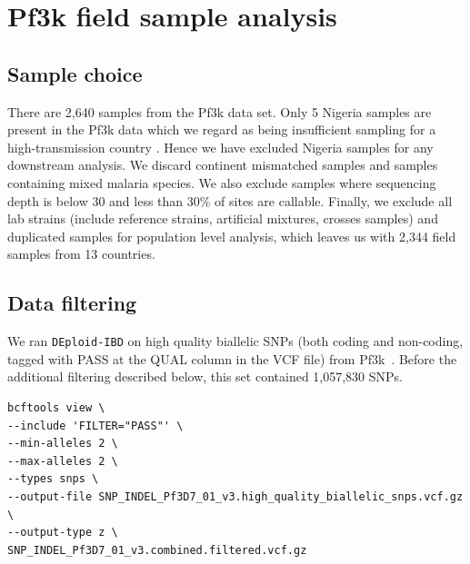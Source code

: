 \documentclass[9pt]{article}
\begin{document}





\newpage

\section{Pf3k field sample analysis}
\subsection{Sample choice}
There are 2,640 samples from the Pf3k data set. Only 5 Nigeria samples are present in the Pf3k data which we regard as being insufficient sampling for a high-transmission country \citep{who2017profileNigeria}. Hence we have excluded Nigeria samples for any downstream analysis. We discard continent mismatched samples and samples containing mixed malaria species. We also exclude samples where sequencing depth is below 30 and less than 30\% of sites are callable. Finally, we exclude all lab strains (include reference strains, artificial mixtures, crosses samples) and duplicated samples for population level analysis, which leaves us with 2,344 field samples from 13 countries.


\subsection{Data filtering}
We ran {\tt DEploid-IBD} on high quality biallelic SNPs (both coding and non-coding, tagged with PASS at the QUAL column in the VCF file) from Pf3k~\citep{pf3k}. Before the additional filtering described below, this set contained 1,057,830 SNPs.
\linespread{1}
\begin{lstlisting}
bcftools view \
--include 'FILTER="PASS"' \
--min-alleles 2 \
--max-alleles 2 \
--types snps \
--output-file SNP_INDEL_Pf3D7_01_v3.high_quality_biallelic_snps.vcf.gz \
--output-type z \
SNP_INDEL_Pf3D7_01_v3.combined.filtered.vcf.gz
\end{lstlisting}
\end{document}
